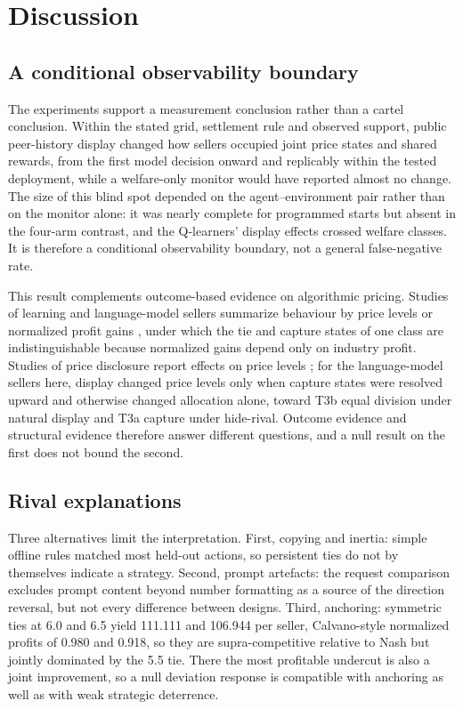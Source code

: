 \documentclass[sigconf,review,anonymous]{acmart}
\begin{document}
\section{Discussion}\label{sec:discussion}

\subsection{A conditional observability boundary}

The experiments support a measurement conclusion rather than a cartel conclusion. Within the stated grid, settlement rule and observed support, public peer-history display changed how sellers occupied joint price states and shared rewards, from the first model decision onward and replicably within the tested deployment, while a welfare-only monitor would have reported almost no change. The size of this blind spot depended on the agent--environment pair rather than on the monitor alone: it was nearly complete for programmed starts but absent in the four-arm contrast, and the Q-learners' display effects crossed welfare classes. It is therefore a conditional observability boundary, not a general false-negative rate.

This result complements outcome-based evidence on algorithmic pricing. Studies of learning and language-model sellers summarize behaviour by price levels or normalized profit gains \cite{calvano2020ai,klein2021autonomous,fish2024algorithmic}, under which the tie and capture states of one class are indistinguishable because normalized gains depend only on industry profit. Studies of price disclosure report effects on price levels \cite{albaek1997government,luco2019who}; for the language-model sellers here, display changed price levels only when capture states were resolved upward and otherwise changed allocation alone, toward T3b equal division under natural display and T3a capture under hide-rival. Outcome evidence and structural evidence therefore answer different questions, and a null result on the first does not bound the second.

\subsection{Rival explanations}

Three alternatives limit the interpretation. First, copying and inertia: simple offline rules matched most held-out actions, so persistent ties do not by themselves indicate a strategy. Second, prompt artefacts: the request comparison excludes prompt content beyond number formatting as a source of the direction reversal, but not every difference between designs. Third, anchoring: symmetric ties at 6.0 and 6.5 yield 111.111 and 106.944 per seller, Calvano-style normalized profits of 0.980 and 0.918, so they are supra-competitive relative to Nash but jointly dominated by the 5.5 tie. There the most profitable undercut is also a joint improvement, so a null deviation response is compatible with anchoring as well as with weak strategic deterrence.
\end{document}
